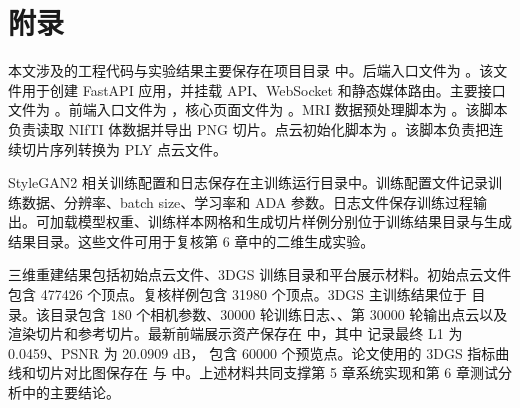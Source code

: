 \chapter*{附\quad 录}
\thispagestyle{thesis-main}

\thesisbodyfont
\justifying


本文涉及的工程代码与实验结果主要保存在项目目录  中。后端入口文件为 。该文件用于创建 FastAPI 应用，并挂载 API、WebSocket 和静态媒体路由。主要接口文件为 。前端入口文件为 ，核心页面文件为 。MRI 数据预处理脚本为 。该脚本负责读取 NIfTI 体数据并导出 PNG 切片。点云初始化脚本为 。该脚本负责把连续切片序列转换为 PLY 点云文件。

StyleGAN2 相关训练配置和日志保存在主训练运行目录中。训练配置文件记录训练数据、分辨率、batch size、学习率和 ADA 参数。日志文件保存训练过程输出。可加载模型权重、训练样本网格和生成切片样例分别位于训练结果目录与生成结果目录。这些文件可用于复核第 6 章中的二维生成实验。

三维重建结果包括初始点云文件、3DGS 训练目录和平台展示材料。初始点云文件  包含 477426 个顶点。复核样例包含 31980 个顶点。3DGS 主训练结果位于  目录。该目录包含 180 个相机参数、30000 轮训练日志、、第 30000 轮输出点云以及渲染切片和参考切片。最新前端展示资产保存在  中，其中  记录最终 L1 为 0.0459、PSNR 为 20.0909 dB， 包含 60000 个预览点。论文使用的 3DGS 指标曲线和切片对比图保存在  与  中。上述材料共同支撑第 5 章系统实现和第 6 章测试分析中的主要结论。
